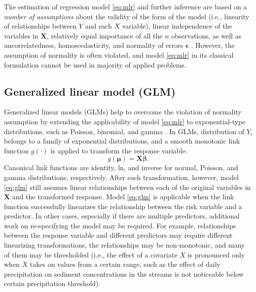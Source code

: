 \documentclass[
]{book}
\begin{document}
The estimation of regression model \eqref{eq:mlr} and further inference are based on a \emph{number of assumptions} about the validity of the form of the model (i.e., linearity of relationships between \(Y\) and each \(X\) variable), linear independence of the variables in \(\mathbf{X}\), relatively equal importance of all the \(n\) observations, as well as uncorrelatedness, homoscedasticity, and normality of errors \(\boldsymbol{\epsilon}\) \citep{Chatterjee:Hadi:2006}. However, the assumption of normality is often violated, and model \eqref{eq:mlr} in its classical formulation cannot be used in majority of applied problems.

\hypertarget{generalized-linear-model-glm}{%
\subsection{Generalized linear model (GLM)}\label{generalized-linear-model-glm}}

Generalized linear models (GLMs) help to overcome the violation of normality assumption by extending the applicability of model \eqref{eq:mlr} to exponential-type distributions, such as Poisson, binomial, and gamma \citep{Wood:2006book}. In GLMs, distribution of \(Y_i\) belongs to a family of exponential distributions, and a smooth monotonic link function \(g(\cdot)\) is applied to transform the response variable:
\begin{equation}
    \label{eq:glm}
    g(\boldsymbol{\mu}) = \mathbf{X}\boldsymbol{\beta}.
\end{equation}
Canonical link functions are identity, ln, and inverse for normal, Poisson, and gamma distributions, respectively. After such transformation, however, model \eqref{eq:glm} still assumes linear relationships between each of the original variables in \(\mathbf{X}\) and the transformed response. Model \eqref{eq:glm} is applicable when the link function successfully linearizes the relationship between the risk variable and a predictor. In other cases, especially if there are multiple predictors, additional work on re-specifying the model may be required. For example, relationships between the response variable and different predictors may require different linearizing transformations, the relationships may be non-monotonic, and many of them may be thresholded (i.e., the effect of a covariate \(X\) is pronounced only when \(X\) takes on values from a certain range, such as the effect of daily precipitation on sediment concentrations in the streams is not noticeable below certain precipitation threshold).
\end{document}
